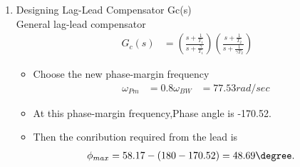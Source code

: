 \begin{enumerate}[label=\thesubsection.\arabic*.,ref=\thesubsection.\theenumi]
\begin{lstlisting}
\end{lstlisting}
Relation between \%OS and Damping ratio
\begin{align}
\zeta &= \frac{-\ln(\%OS/100)}{\sqrt{(\pi)^2 + (\ln(\%OS/100))^2}}
\end{align}
\begin{align}
\implies\zeta &= 0.517 
\end{align}
Phase Margin for a Damping ratio is given by
\begin{align}
\phi_{m} &= 90\degree - \arctan(\frac{\sqrt{-2\zeta^2+\sqrt{1+4\zeta^4}}}{2\zeta}
\end{align}
\begin{align}
\implies \phi_{m} &= 53.17\degree
\end{align}
For an additional 5\degree for lag compensation,Phase margin is
\begin{align}
    \phi_{m} &= 53.17\degree + 5\degree= 58.17\degree
\end{align}
\textbf{Note} : Adding 5\degree phase angle to compensate the phase angle contribution of the lag compensator.
Bandwidth frequency is given by
\begin{align}
\omega_{BW} &= \omega_{n}(\sqrt{(1-2\zeta^2)+\sqrt{4\zeta^4-4\zeta^2+2}})
\end{align}
where
\begin{align}
    \omega_{n} &= \frac{4}{T_{s}\zeta}
\end{align}
Given settling time = 0.1 sec then 
\begin{align}
    \omega_{n} &= 77.37 rad/sec 
\end{align}
then
\begin{align}
    \omega_{BW} &= 96.91 rad/sec
\end{align}
\item Designing Lag-Lead Compensator Gc(s) \\
\solution 
General lag-lead compensator 
\begin{align}
G_{c}(s) &= \left(\frac{s+\frac{1}{T_1}}{s+\frac{\gamma}{T_1}}\right)\left(\frac{s+\frac{1}{T_2}}{s+\frac{1}{\gamma T_2}}\right) 
\end{align}
\begin{itemize}
\item Choose the new phase-margin frequency 
\begin{align}
    \omega_{Pm} &= 0.8 \omega_{BW} &= 77.53 rad/sec
\end{align}
\item At this phase-margin frequency,Phase angle is -170.52\degree.
\item Then the conribution required from the lead is
\begin{align}
    \phi_{max} &= 58.17-(180-170.52)=48.69\degree.
\end{align}


\end{itemize}
\end{enumerate}
